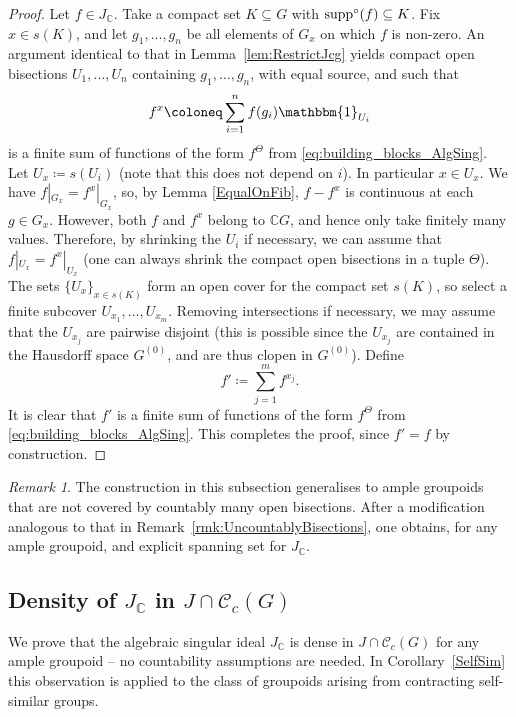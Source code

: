 \documentclass[11pt, oneside, reqno]{amsart}
\newcommand{\Gu}{G^{(0)}}
\newcommand{\cg}{\mathscr{C}_c(G)}
\newcommand{\supp}{{\rm supp}}
\newcommand{\osupp}{\supp^{\circ}}
\newcommand{\PRLsep}{\noindent\makebox[\linewidth]{\resizebox{0.3333\linewidth}{1pt}{$\bullet$}}\bigskip}
\theoremstyle{definition}
\theoremstyle{remark}
\newtheorem{rmk}[thm]{Remark}
\numberwithin{equation}{section}
\begin{document}
\begin{proof}
    Let $f \in J_\mathbb{C}$. Take a compact set $K \subseteq G$ with $\osupp(f) \subseteq K$. Fix $x \in s(K)$, and let $g_1, \dots, g_n$ be all elements of $G_x$ on which $f$ is non-zero. An argument identical to that in Lemma~\ref{lem:RestrictJcg} yields compact open bisections $U_1, \dots, U_n$ containing $g_1, \dots, g_n$, with equal source, and such that
    \[
    f^x \coloneq \sum_{i=1}^n f(g_i) \mathbbm{1}_{U_i}
    \]
    is a finite sum of functions of the form $f^\Theta$ from \eqref{eq:building_blocks_AlgSing}. Let $U_x \coloneq s(U_i)$ (note that this does not depend on $i$). In particular $x \in U_x$. We have $f|_{G_{x}} = f^x|_{G_{x}}$, so, by Lemma \ref{EqualOnFib}, $f-f^x$ is continuous at each $g \in G_x$. However, both $f$ and $f^x$ belong to $\mathbb{C}G$, and hence only take finitely many values. Therefore, by shrinking the $U_i$ if necessary, we can assume that $f|_{U_x} = f^x|_{U_x}$ (one can always shrink the compact open bisections in a tuple $\Theta$). The sets $\{U_x\}_{x \in s(K)}$ form an open cover for the compact set $s(K)$, so select a finite subcover $U_{x_1}, \dotsc, U_{x_m}$. Removing intersections if necessary, we may assume that the $U_{x_j}$ are pairwise disjoint (this is possible since the $U_{x_j}$ are contained in the Hausdorff space $\Gu$, and are thus clopen in $\Gu$). Define
    \[
    f' \coloneq \sum_{j=1}^m f^{x_j} .
    \]
    It is clear that $f'$ is a finite sum of functions of the form $f^\Theta$ from \eqref{eq:building_blocks_AlgSing}. This completes the proof, since $f' = f$ by construction.
\end{proof}

\begin{rmk}
    The construction in this subsection generalises to ample groupoids that are not covered by countably many open bisections. After a modification analogous to that in Remark~\ref{rmk:UncountablyBisections}, one obtains, for any ample groupoid, and explicit spanning set for $J_\mathbb{C}$.
\end{rmk}

\PRLsep

\subsection{Density of $J_\mathbb{C}$ in $J \cap \cg$}\label{subsec:AlgSingDenseJcg} We prove that the algebraic singular ideal $J_\mathbb{C}$ is dense in $J \cap \cg$ for any ample groupoid -- no countability assumptions are needed. In Corollary~\ref{SelfSim} this observation is applied to the class of groupoids arising from contracting self-similar groups.
\end{document}
